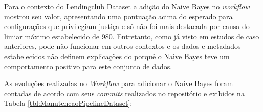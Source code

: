 \documentclass[twocolumn]{article}
\begin{document}
\begin{table}[H]
\begin{center}
  \caption{Melhores opções escolhidas pelo modelo MAPE-K \\ Todos os métodos - 25\% Performance/75\% Fairness}
\label{tbl:ScoreMAPEKLendingclubCaso32575}
\end{center}
\end{table}

Para o contexto do Lendingclub Dataset a adição do Naive Bayes no \textit{workflow} mostrou seu valor, apresentando uma pontuação acima do esperado para configurações que privilegiam justiça e só não foi mais destacada por causa do limiar máximo estabelecido de 980. Entretanto, como já visto em estudos de caso anteriores, pode não funcionar em outros contextos e os dados e metadados estabelecidos não definem explicações do porquê o Naive Bayes teve um comportamento positivo para este conjunto de dados.

As evoluções realizadas no \textit{Workflow} para adicionar o Naive Bayes foram contadas de acordo com seus \textit{commits} realizados no repositório e exibidos  na Tabela \ref{tbl:ManutencaoPipelineDataset}:
\end{document}
